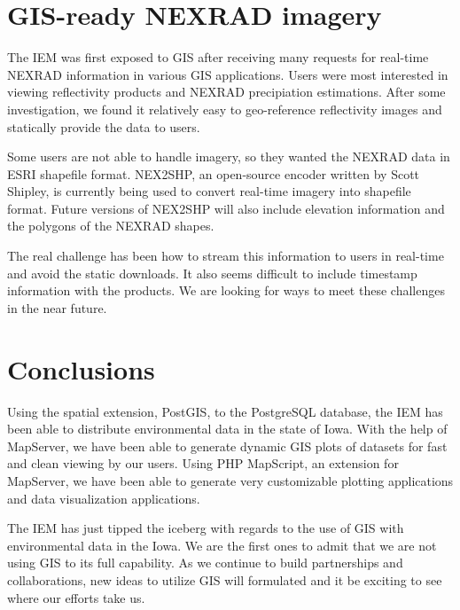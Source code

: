 \documentclass[twocolumn]{article}
\begin{document}
\section{GIS-ready NEXRAD imagery}

The IEM was first exposed to GIS after receiving many requests for real-time
NEXRAD information in various GIS applications.  Users were most interested in
viewing reflectivity products and NEXRAD precipiation estimations. After 
some investigation, we found it relatively easy to geo-reference 
reflectivity images and statically provide the data to users.

Some users are not able to handle imagery, so they wanted the NEXRAD data in
ESRI shapefile format.  NEX2SHP, an open-source encoder written by Scott Shipley,
 is currently being used to convert real-time imagery into shapefile format.
Future versions of NEX2SHP will also include elevation information and the 
polygons of the NEXRAD shapes.  

The real challenge has been how to stream this information to users in real-time
and avoid the static downloads.  It also seems difficult to include timestamp
information with the products.  We are looking for ways to meet these 
challenges in the near future.

\section{Conclusions}

Using the spatial extension, PostGIS, to the PostgreSQL database, the IEM has
been able to distribute environmental data in the state of Iowa.  With the help
of MapServer, we have been able to generate dynamic GIS plots of datasets for
fast and clean viewing by our users.  Using PHP MapScript, an extension for 
MapServer, we have been able to generate very customizable plotting applications
and data visualization applications.

The IEM has just tipped the iceberg with regards to the use of GIS with
environmental data in the Iowa.  We are the first ones to admit that we 
are not using GIS to its full capability. As we continue to build 
partnerships and  collaborations, new ideas to utilize GIS will 
formulated and it be exciting to see where our efforts take us.
\end{document}
